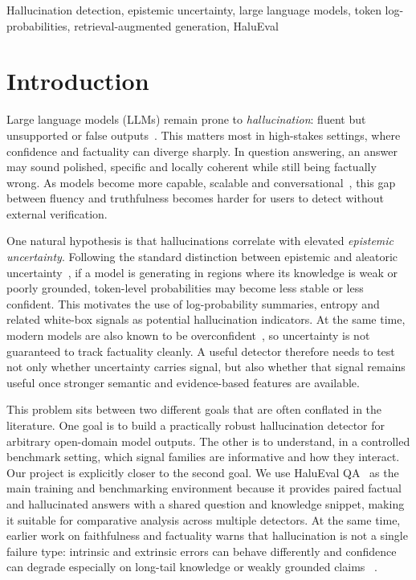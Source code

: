 \documentclass[conference]{IEEEtran}
\begin{document}
\begin{IEEEkeywords}
Hallucination detection, epistemic uncertainty, large language models, token log-probabilities, retrieval-augmented generation, HaluEval
\end{IEEEkeywords}

\section{Introduction}
\label{sec:intro}

Large language models (LLMs) remain prone to \emph{hallucination}: fluent but unsupported or false outputs~\cite{ji2023survey}. This matters most in high-stakes settings, where confidence and factuality can diverge sharply. In question answering, an answer may sound polished, specific and locally coherent while still being factually wrong. As models become more capable, scalable and conversational~\cite{brown2020gpt3,wei2022emergent}, this gap between fluency and truthfulness becomes harder for users to detect without external verification.

One natural hypothesis is that hallucinations correlate with elevated
\emph{epistemic uncertainty}. Following the standard distinction between
epistemic and aleatoric uncertainty~\cite{hullermeier2021aleatoric}, if a model is generating in regions where its
knowledge is weak or poorly grounded, token-level probabilities may become less
stable or less confident. This motivates the use of log-probability summaries,
entropy and related white-box signals as potential hallucination indicators.
At the same time, modern models are also known to be overconfident~\cite{guo2017calibration},
so uncertainty is not guaranteed to track factuality cleanly. A useful detector
therefore needs to test not only whether uncertainty carries signal, but also
whether that signal remains useful once stronger semantic and evidence-based
features are available.

This problem sits between two different goals that are often conflated in the
literature. One goal is to build a practically robust hallucination detector
for arbitrary open-domain model outputs. The other is to understand, in a
controlled benchmark setting, which signal families are informative and how
they interact. Our project is explicitly closer to the second goal. We use
HaluEval QA~\cite{li2023halueval} as the main training and benchmarking
environment because it provides paired factual and hallucinated answers with a
shared question and knowledge snippet, making it suitable for comparative
analysis across multiple detectors. At the same time, earlier work on
faithfulness and factuality warns that hallucination is not a single failure
type: intrinsic and extrinsic errors can behave differently and confidence can
degrade especially on long-tail knowledge or weakly grounded claims
~\cite{maynez2020faithfulness,mallen2023trust}.
\end{document}
